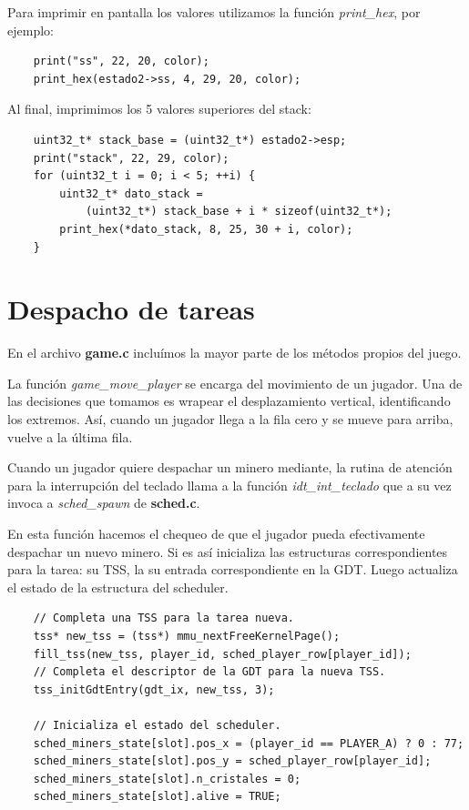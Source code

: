 \documentclass[a4paper]{article}
\newenvironment{codesnippet}{%
	\begin{Sbox}\begin{minipage}{\textwidth}\sffamily\small}%
	{\end{minipage}\end{Sbox}%
		\begin{center}%
		\vspace{-0.4cm}\colorbox{litegrey}{\TheSbox}\end{center}\vspace{0.3cm}}
\begin{document}
Para imprimir en pantalla los valores utilizamos la función \textit{print_hex}, por ejemplo:

\begin{codesnippet}
  \begin{verbatim}
    print("ss", 22, 20, color);
    print_hex(estado2->ss, 4, 29, 20, color);
     \end{verbatim}
\end{codesnippet}

Al final, imprimimos los 5 valores superiores del stack:

\begin{codesnippet}
  \begin{verbatim}
    uint32_t* stack_base = (uint32_t*) estado2->esp;
    print("stack", 22, 29, color);
    for (uint32_t i = 0; i < 5; ++i) {
        uint32_t* dato_stack =
            (uint32_t*) stack_base + i * sizeof(uint32_t*);
        print_hex(*dato_stack, 8, 25, 30 + i, color);
    }
     \end{verbatim}
\end{codesnippet}

\section{Despacho de tareas}

En el archivo \textbf{game.c} incluímos la mayor parte de los métodos propios del juego.

La función \textit{game_move_player} se encarga del movimiento de un jugador. Una de las decisiones que tomamos es
wrapear el desplazamiento vertical, identificando los extremos. Así, cuando un jugador llega a la fila cero y se mueve
para arriba, vuelve a la última fila.

Cuando un jugador quiere despachar un minero mediante, la rutina de atención para la interrupción del teclado llama a la
función \textit{idt_int_teclado} que a su vez invoca a \textit{sched_spawn} de \textbf{sched.c}.

En esta función hacemos el chequeo de que el jugador pueda efectivamente despachar un nuevo minero. Si es así inicializa
las estructuras correspondientes para la tarea: su TSS, la su entrada correspondiente en la GDT. Luego actualiza el
estado de la estructura del scheduler.

\begin{codesnippet}
  \begin{verbatim}
    // Completa una TSS para la tarea nueva.
    tss* new_tss = (tss*) mmu_nextFreeKernelPage();
    fill_tss(new_tss, player_id, sched_player_row[player_id]);
    // Completa el descriptor de la GDT para la nueva TSS.
    tss_initGdtEntry(gdt_ix, new_tss, 3);

    // Inicializa el estado del scheduler.
    sched_miners_state[slot].pos_x = (player_id == PLAYER_A) ? 0 : 77;
    sched_miners_state[slot].pos_y = sched_player_row[player_id];
    sched_miners_state[slot].n_cristales = 0;
    sched_miners_state[slot].alive = TRUE;
  \end{verbatim}
\end{codesnippet}
\end{document}
